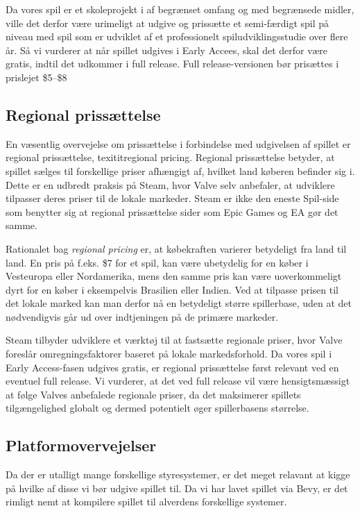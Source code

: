 Da vores spil er et skoleprojekt i af begrænset omfang og med begrænsede midler, ville det derfor være urimeligt at udgive og prissætte et semi-færdigt spil på niveau med spil som er udviklet af et professionelt spiludviklingsstudie over flere år. Så vi vurderer at når spillet udgives i Early Accees, skal det derfor være gratis, indtil det udkommer i full release. Full release-versionen bør prisættes i prislejet \$5--\$8


\subsection*{Regional prissættelse}
En væsentlig overvejelse om prissættelse i forbindelse med udgivelsen af spillet er regional prissættelse, texitit{regional pricing}. Regional prissættelse betyder, at spillet sælges til forskellige priser afhængigt af, hvilket land køberen befinder sig i. Dette er en udbredt praksis på Steam, hvor Valve selv anbefaler, at udviklere tilpasser deres priser til de lokale markeder. Steam er ikke den eneste Spil-side som benytter sig at regional prissættelse sider som Epic Games og EA  gør det samme.

Rationalet bag \textit{regional pricing} er, at købekraften varierer betydeligt fra land til 
land. En pris på f.eks. \$7 for et spil, kan være ubetydelig for en køber i Vesteuropa eller Nordamerika, mens den samme pris kan være uoverkommeligt dyrt for en køber i eksempelvis Brasilien eller Indien. Ved at tilpasse prisen til det lokale marked kan man derfor nå en betydeligt større spillerbase, uden at det nødvendigvis går ud over indtjeningen på de primære markeder.

Steam tilbyder udviklere et værktøj til at fastsætte regionale priser, hvor Valve foreslår omregningsfaktorer baseret på lokale markedsforhold. Da vores spil i Early Access-fasen udgives gratis, er regional prissættelse først relevant ved en eventuel full release. Vi vurderer, at det ved full release vil være hensigtsmæssigt at følge Valves anbefalede regionale priser, da det maksimerer spillets tilgængelighed globalt og dermed potentielt øger spillerbasens størrelse.


\subsection{Platformovervejelser}
Da der er utalligt mange forskellige styresystemer, er det meget relavant at kigge på hvilke af disse vi bør udgive spillet til. Da vi har lavet spillet via Bevy, er det rimligt nemt at kompilere spillet til alverdens forskellige systemer.

